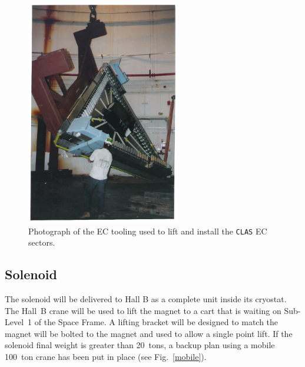 \begin{figure}[htbp]
\centering
\includegraphics[width=0.6\textwidth]{ec_install.eps}
\caption{\small{Photograph of the EC tooling used to lift and install
the {\tt CLAS} EC sectors.}}
\label{ectool1}
\end{figure}

\subsection{Solenoid}

The solenoid will be delivered to Hall B as a complete unit inside its 
cryostat.  The Hall~B crane will be used to lift the magnet to a cart that 
is waiting on Sub-Level~1 of the Space Frame.  A lifting bracket will 
be designed to match the magnet will be bolted to the magnet and used to 
allow a single point lift.  If the solenoid final weight is greater than
20~tons, a backup plan using a mobile 100~ton crane has been put in
place (see Fig.~\ref{mobile}).

